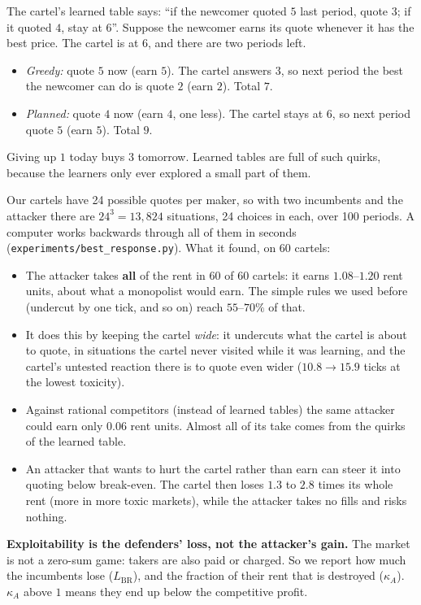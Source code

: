 \documentclass[11pt]{article}
\begin{document}
\begin{example}
The cartel's learned table says: ``if the newcomer quoted $5$ last period, quote $3$; if it quoted $4$,
stay at $6$''. Suppose the newcomer earns its quote whenever it has the best price. The cartel is at $6$,
and there are two periods left.
\begin{itemize}
\item \emph{Greedy:} quote $5$ now (earn $5$). The cartel answers $3$, so next period the best the newcomer
can do is quote $2$ (earn $2$). Total $7$.
\item \emph{Planned:} quote $4$ now (earn $4$, one less). The cartel stays at $6$, so next period quote
$5$ (earn $5$). Total $9$.
\end{itemize}
Giving up $1$ today buys $3$ tomorrow. Learned tables are full of such quirks, because the learners
only ever explored a small part of them.
\end{example}
Our cartels have 24 possible quotes per maker, so with two incumbents and the attacker there are
$24^3=13{,}824$ situations, 24 choices in each, over 100 periods. A computer works backwards through all
of them in seconds (\texttt{experiments/best\_response.py}). What it found, on 60 cartels:
\begin{itemize}
\item The attacker takes \textbf{all} of the rent in 60 of 60 cartels: it earns $1.08$--$1.20$ rent units,
about what a monopolist would earn. The simple rules we used before (undercut by one tick, and so on)
reach $55$--$70\%$ of that.
\item It does this by keeping the cartel \emph{wide}: it undercuts what the cartel is about to quote, in
situations the cartel never visited while it was learning, and the cartel's untested reaction there is
to quote even wider ($10.8\to15.9$ ticks at the lowest toxicity).
\item Against rational competitors (instead of learned tables) the same attacker could earn only $0.06$
rent units. Almost all of its take comes from the quirks of the learned table.
\item An attacker that wants to hurt the cartel rather than earn can steer it into quoting below
break-even. The cartel then loses $1.3$ to $2.8$ times its whole rent (more in more toxic markets), while the attacker takes no fills and risks nothing.
\end{itemize}
\begin{warning}
\textbf{Exploitability is the defenders' loss, not the attacker's gain.} The market is not a zero-sum
game: takers are also paid or charged. So we report how much the incumbents lose ($L_{\mathrm{BR}}$),
and the fraction of their rent that is destroyed ($\kappa_A$). $\kappa_A$ above $1$ means they end up
below the competitive profit.
\end{warning}
\end{document}
